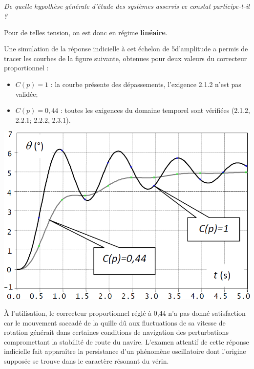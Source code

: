 \documentclass[10pt,fleqn]{article} %
\begin{document}
\begin{multicols}{2}
\subparagraph{}\textit{De quelle hypothèse générale d’étude des systèmes asservis ce constat participe-t-il ?}
\ifprof
\begin{corrige}
Pour de telles tension, on est donc en régime \textbf{linéaire}.
\end{corrige}
\else
\fi

\ifprof
\else
Une simulation de la réponse indicielle à cet échelon de 5\degres d’amplitude a permis de tracer les courbes de la
figure suivante, obtenues pour deux valeurs du correcteur proportionnel :
\begin{itemize}
\item $C(p) = 1$ : la courbe présente des dépassements, l'exigence 2.1.2 n'est pas validée;%
\item $C(p) = 0,44$ : toutes les exigences du domaine temporel sont vérifiées (2.1.2, 2.2.1; 2.2.2, 2.3.1).%
\end{itemize}

\begin{center}
\includegraphics[width=\linewidth]{images/fig_06}
\end{center}

À l’utilisation, le correcteur proportionnel réglé à 0,44 n’a pas donné satisfaction car le mouvement saccadé
de la quille dû aux fluctuations de sa vitesse de rotation générait dans certaines conditions de navigation des
perturbations compromettant la stabilité de route du navire. L’examen attentif de cette réponse indicielle
fait apparaître la persistance d’un phénomène oscillatoire dont l’origine supposée se trouve dans le
caractère résonant du vérin.

\fi


\end{multicols}
\end{document}
